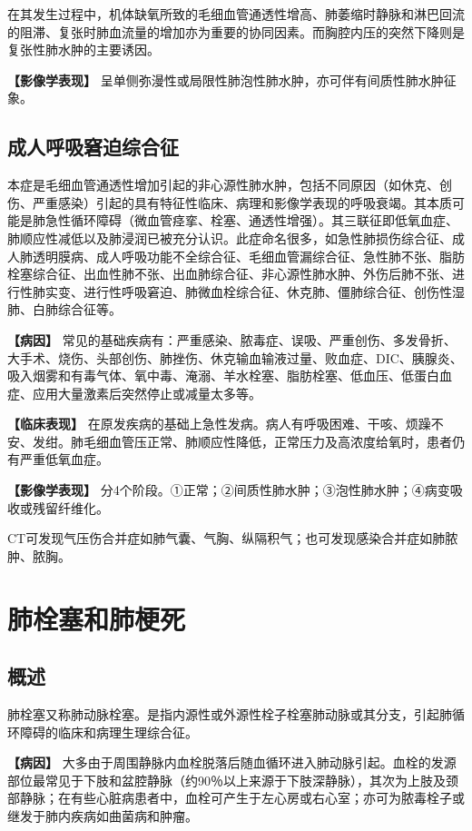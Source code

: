 在其发生过程中，机体缺氧所致的毛细血管通透性增高、肺萎缩时静脉和淋巴回流的阻滞、复张时肺血流量的增加亦为重要的协同因素。而胸腔内压的突然下降则是复张性肺水肿的主要诱因。

\textbf{【影像学表现】}
呈单侧弥漫性或局限性肺泡性肺水肿，亦可伴有间质性肺水肿征象。

\subsection{成人呼吸窘迫综合征}

本症是毛细血管通透性增加引起的非心源性肺水肿，包括不同原因（如休克、创伤、严重感染）引起的具有特征性临床、病理和影像学表现的呼吸衰竭。其本质可能是肺急性循环障碍（微血管痉挛、栓塞、通透性增强）。其三联征即低氧血症、肺顺应性减低以及肺浸润已被充分认识。此症命名很多，如急性肺损伤综合征、成人肺透明膜病、成人呼吸功能不全综合征、毛细血管漏综合征、急性肺不张、脂肪栓塞综合征、出血性肺不张、出血肺综合征、非心源性肺水肿、外伤后肺不张、进行性肺实变、进行性呼吸窘迫、肺微血栓综合征、休克肺、僵肺综合征、创伤性湿肺、白肺综合征等。

\textbf{【病因】}
常见的基础疾病有：严重感染、脓毒症、误吸、严重创伤、多发骨折、大手术、烧伤、头部创伤、肺挫伤、休克输血输液过量、败血症、DIC、胰腺炎、吸入烟雾和有毒气体、氧中毒、淹溺、羊水栓塞、脂肪栓塞、低血压、低蛋白血症、应用大量激素后突然停止或减量太多等。

\textbf{【临床表现】}
在原发疾病的基础上急性发病。病人有呼吸困难、干咳、烦躁不安、发绀。肺毛细血管压正常、肺顺应性降低，正常压力及高浓度给氧时，患者仍有严重低氧血症。

\textbf{【影像学表现】}
分4个阶段。①正常；②间质性肺水肿；③泡性肺水肿；④病变吸收或残留纤维化。

CT可发现气压伤合并症如肺气囊、气胸、纵隔积气；也可发现感染合并症如肺脓肿、脓胸。

\section{肺栓塞和肺梗死}

\subsection{概述}

肺栓塞又称肺动脉栓塞。是指内源性或外源性栓子栓塞肺动脉或其分支，引起肺循环障碍的临床和病理生理综合征。

\textbf{【病因】}
大多由于周围静脉内血栓脱落后随血循环进入肺动脉引起。血栓的发源部位最常见于下肢和盆腔静脉（约90％以上来源于下肢深静脉），其次为上肢及颈部静脉；在有些心脏病患者中，血栓可产生于左心房或右心室；亦可为脓毒栓子或继发于肺内疾病如曲菌病和肿瘤。

